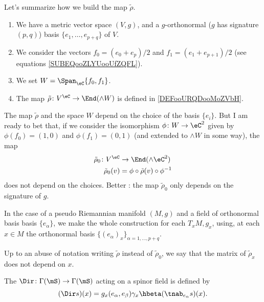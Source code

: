 \begin{normaltext}		\label{NORMooUCULooJVYkzO}
	Let's summarize how we build the map \( \tilde \rho\).
	\begin{enumerate}
		\item
		      We have a metric vector space \( (V,g)\), and a \( g\)-orthonormal (\( g\) has signature \( (p,q)\)) basis \( \{ e_1,\ldots,e_{p+q} \}\) of \( V\).

		\item
		      We consider the vectors \( f_0=(e_0+e_p)/2\) and \( f_1=(e_1+e_{p+1})/2\) (see equations \eqref{SUBEQooZLYUooUfZQFL}).
		\item
		      We set \( W=\Span_{\eC}\{ f_0,f_1 \}\).
		\item
		      The map \(\tilde \rho \colon V^{\eC}\to \End(\wedge W)  \) is defined in \eqref{DEFooURQDooMoZVbH}.
	\end{enumerate}
	The map \( \tilde \rho\) and the space \( W\) depend on the choice of the basis \( \{ e_i \}\). But I am ready to bet that, if we consider the isomorphism \(\phi \colon W\to \eC^2  \) given by \( \phi(f_0)=(1,0)\) and \( \phi(f_1)=(0,1)\) (and extended to \( \wedge W\) in some way), the map
	\begin{equation}
		\begin{aligned}
			\tilde \rho_0\colon V^{\eC} & \to \End(\wedge \eC^2)                 \\
			\tilde \rho_0(v)            & =\phi\circ\tilde \rho(v)\circ\phi^{-1}
		\end{aligned}
	\end{equation}
	does not depend on the choices. Better : the map \( \tilde \rho_0\) only depends on the signature of \( g\).

	In the case of a pseudo Riemannian manifold \( (M,g)\) and a field of orthonormal basis basis \( \{ e_{\alpha} \}\), we make the whole construction for each \( T_xM, g_x\), using, at each \( x\in M\) the orthonormal basis \( \{ (e_{\alpha})_x \}_{\alpha=1,\ldots,p+q}\).

	Up to an abuse of notation writing \( \tilde \rho\) instead of \( \tilde \rho_0\), we say that the matrix of \( \tilde \rho_x\) does not depend on \( x\).
\end{normaltext}

\begin{definition}		\label{DEFooEGABooZPccEp}
	The  $\Dir\colon \Gamma(\mS)\to \Gamma(\mS)$ acting on a spinor field is defined by
	\begin{equation}\label{dirac}
		(\Dir s)(x)=g_x(e_{\alpha},e_{\beta})\gamma_x\hbeta(\tnab_{e_{\alpha}}s)(x).
	\end{equation}
\end{definition}

